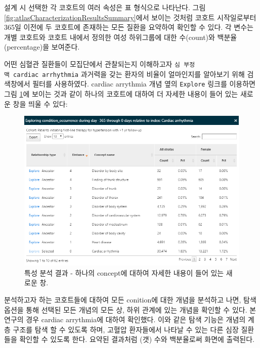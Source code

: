 \documentclass[11pt]{book}
\theoremstyle{definition}
\theoremstyle{definition}
\theoremstyle{definition}
\theoremstyle{remark}
\begin{document}
설계 시 선택한 각 코호트의 여러 속성은 표 형식으로 나타난다. 그림
\ref{fig:atlasCharacterizationResultsSummary}에서 보이는 것처럼 코호트
시작일로부터 365일 이전에 두 코호트에 존재하는 모든 질환을 요약하여
확인할 수 있다. 각 변수는 개별 코호트와 코호트 내에서 정의한 여성
하위그룹에 대한 수(count)와 백분율(percentage)을 보여준다.

어떤 심혈관 질환들이 모집단에서 관찰되는지 이해하고자
\texttt{심\ 부정맥\ cardiac\ arrhythmia} 과거력을 갖는 환자의 비율이
얼마인지를 알아보기 위해 검색창에서 필터를 사용하였다. cardiac arrythmia
개념 옆의 \texttt{Explore} 링크를 이용하면 그림
\ref{fig:atlasCharacterizationResultsExplore}에 보이는 것과 같이 하나의
코호트에 대하여 더 자세한 내용이 들어 있는 새로운 창을 띄울 수 있다:

\begin{figure}

{\centering \includegraphics[width=1\linewidth]{images/Characterization/atlasCharacterizationResultsExplore} 

}

\caption{특성 분석 결과 - 하나의 concept에 대하여 자세한 내용이 들어 있는 새로운 창.}\label{fig:atlasCharacterizationResultsExplore}
\end{figure}

분석하고자 하는 코호트들에 대하여 모든 conition에 대한 개념을 분석하고
나면, 탐색 옵션을 통해 선택된 모든 개념의 모든 상, 하위 관계에 있는
개념을 확인할 수 있다. 본 연구의 경우 cardiac arrythmia에 대하여
확인했다. 이와 같은 탐색 기능은 개념의 계층 구조를 탐색 할 수 있도록
하며, 고혈압 환자들에서 나타날 수 있는 다른 심장 질환들을 확인할 수
있도록 한다. 요약된 결과처럼 (갯) 수와 백분율로써 화면에 출력된다.
\end{document}
